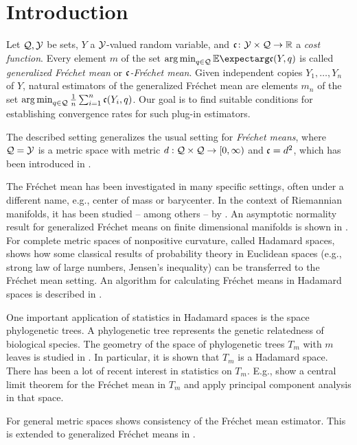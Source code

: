 \section{Introduction}
%
%
Let $\mathcal{Q}, \mathcal{Y}$ be sets, $Y$ a $\mathcal{Y}$-valued random variable, and $\mathfrak{c} \colon \mathcal{Y}\times \mathcal{Q} \to \mathbb{R}$ a \textit{cost function}. Every element $m$ of the set  $\argmin_{q\in\mc Q}\Ex{\mf c(Y,q)}$ is called \textit{generalized Fréchet mean} or \textit{$\mathfrak{c}$-Fréchet mean}.
Given independent copies $Y_1, \dots, Y_n$ of $Y$, natural estimators of the generalized Fréchet mean are elements $m_n$ of  the set $\operatorname*{arg\,min}_{q\in\mathcal{Q}}  \frac1n\sum_{i=1}^n \mathfrak{c}(Y_i,q)$. 
Our goal is to find suitable conditions for establishing convergence rates for such plug-in estimators. 

The described setting generalizes the usual setting for \textit{Fréchet means}, where $\mathcal{Q} = \mathcal{Y}$ is a metric space with metric $d : \mathcal{Q} \times \mathcal{Q} \to [0, \infty)$ and $\mathfrak{c} = d^2$, which has been introduced in \cite{frechet48}.

The Fréchet mean has been investigated in many specific settings, often under a different name, e.g., center of mass or barycenter.
In the context of Riemannian manifolds, it has been studied -- among others -- by \cite{bhattacharya03}.
An asymptotic normality result for generalized Fréchet means on finite dimensional manifolds is shown in \cite{eltzner19}.
For complete metric spaces of nonpositive curvature, called Hadamard spaces, \cite{sturm03} shows how some classical results of probability theory in Euclidean spaces (e.g., strong law of large numbers, Jensen's inequality) can be transferred to the Fréchet mean setting. An algorithm for calculating Fréchet means in Hadamard spaces is described in \cite{bacak14}.

One important application of statistics in Hadamard spaces is the space phylogenetic trees. A phylogenetic tree represents the genetic relatedness of biological species. The geometry of the space of phylogenetic trees $T_m$ with $m$ leaves is studied in \cite{billera01}. In particular, it is shown that $T_m$ is a Hadamard space. There has been a lot of recent interest in statistics on $T_m$. E.g., \cite{barden18} show a central limit theorem for the Fréchet mean in $T_m$ and \cite{nye11} apply principal component analysis in that space.

For general metric spaces \cite{ziezold77} shows consistency of the Fréchet mean estimator. This is extended to generalized Fréchet means in \cite{huckemann11}.

